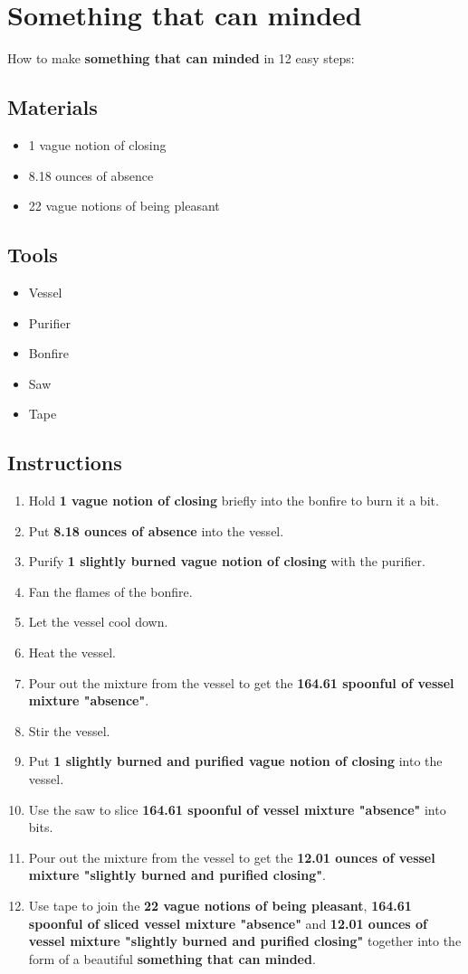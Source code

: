 \documentclass{article}
\begin{document}
\section{Something that can minded}How to make \textbf{something that can minded} in 12 easy steps:

\subsection{Materials}\begin{itemize}
\item 
1 vague notion of closing
\item 
8.18 ounces of absence
\item 
22 vague notions of being pleasant
\end{itemize}
\subsection{Tools}\begin{itemize}
\item 
Vessel
\item 
Purifier
\item 
Bonfire
\item 
Saw
\item 
Tape
\end{itemize}
\subsection{Instructions}\begin{enumerate}
\item 
Hold \textbf{1 vague notion of closing} briefly into the bonfire to burn it a bit.
\item 
Put \textbf{8.18 ounces of absence} into the vessel.
\item 
Purify \textbf{1 slightly burned vague notion of closing} with the purifier.
\item 
Fan the flames of the bonfire.
\item 
Let the vessel cool down.
\item 
Heat the vessel.
\item 
Pour out the mixture from the vessel to get the \textbf{164.61 spoonful of vessel mixture "absence"}.
\item 
Stir the vessel.
\item 
Put \textbf{1 slightly burned and purified vague notion of closing} into the vessel.
\item 
Use the saw to slice \textbf{164.61 spoonful of vessel mixture "absence"} into bits.
\item 
Pour out the mixture from the vessel to get the \textbf{12.01 ounces of vessel mixture "slightly burned and purified closing"}.
\item 
Use tape to join the \textbf{22 vague notions of being pleasant}, \textbf{164.61 spoonful of sliced vessel mixture "absence"} and \textbf{12.01 ounces of vessel mixture "slightly burned and purified closing"} together into the form of a beautiful \textbf{something that can minded}.
\end{enumerate}
\newpage
\end{document}
